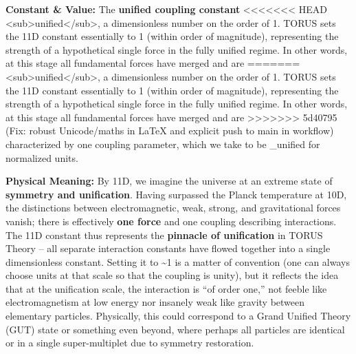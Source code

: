 \documentclass[]{article}
\begin{document}
\textbf{Constant \& Value:} The \textbf{unified coupling constant}
<<<<<<< HEAD
\alpha\textless sub\textgreater unified\textless/sub\textgreater, a
dimensionless number on the order of 1\hspace{0pt}. TORUS sets the 11D
constant essentially to 1 (within order of magnitude), representing the
strength of a hypothetical single force in the fully unified regime. In
other words, at this stage all fundamental forces have merged and are
=======
\alpha\textless{}sub\textgreater{}unified\textless{}/sub\textgreater{}, a
dimensionless number on the order of 1​. TORUS sets the 11D constant
essentially to 1 (within order of magnitude), representing the strength
of a hypothetical single force in the fully unified regime. In other
words, at this stage all fundamental forces have merged and are
>>>>>>> 5d40795 (Fix: robust Unicode/maths in LaTeX and explicit push to main in workflow)
characterized by one coupling parameter, which we take to be \alpha\_unified
 for normalized units.

\textbf{Physical Meaning:} By 11D, we imagine the universe at an extreme
state of \textbf{symmetry and unification}. Having surpassed the Planck
temperature at 10D, the distinctions between electromagnetic, weak,
strong, and gravitational forces vanish; there is effectively
\textbf{one force} and one coupling describing interactions​. The 11D
constant thus represents the \textbf{pinnacle of unification} in TORUS
Theory -- all separate interaction constants have flowed together into a
single dimensionless constant. Setting it to \textasciitilde{}1 is a
matter of convention (one can always choose units at that scale so that
the coupling is unity), but it reflects the idea that at the unification
scale, the interaction is ``of order one,'' not feeble like
electromagnetism at low energy nor insanely weak like gravity between
elementary particles. Physically, this could correspond to a Grand
Unified Theory (GUT) state or something even beyond, where perhaps all
particles are identical or in a single super-multiplet due to symmetry
restoration​.
\end{document}
